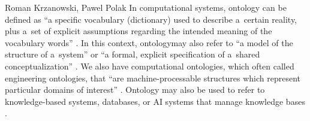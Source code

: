 \begin{artengenv2auth}{Roman Krzanowski, Pawel Polak}
In computational systems, ontology can be defined as ``a specific vocabulary (dictionary) used to describe a~certain reality, plus a~set of explicit assumptions regarding the intended meaning of the vocabulary words''
\parencites[see][]{guarino_ontologies_1995}[][]{guarino_what_2009}. %
 In this context, ontologymay also refer to ``a model of the structure of a~system'' 
\parencite[][]{guarino_what_2009} %
 or ``a formal, explicit specification of a~shared conceptualization'' 
\parencite[][]{studer_knowledge_1998}. %
 We also have computational ontologies, which often called engineering ontologies, that ``are machine-processable structures which represent particular domains of interest'' 
\parencite[][]{husakova_formal_2020}. %
 Ontology may also be used to refer to knowledge-based systems, databases, or AI systems that manage knowledge bases 
\parencites[see the discussions of][]{sharman_ontologies_2007}[][]{staab_handbook_2009}[][]{garbacz_formal_2014}[][]{husakova_formal_2020}.%



\end{artengenv2auth}
